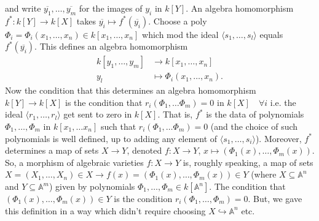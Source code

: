 \documentclass{article}
\newcommand{\A}{\mathbb{A}}
\begin{document}
and write $\overline{y_1}, \dotsc, \overline{y_m}$ for the images of $y_i$ in $k[Y]$.
An algebra homomorphism $f^*: k[Y] \to k[X]$ takes $\overline{y_i} \mapsto f^*(\overline{y_i})$.
Choose a poly $\Phi_i = \Phi_i(x_1, \dotsc, x_n) \in k[x_1, \dotsc, x_n]$ which mod the ideal $\langle s_1, \dotsc, s_l \rangle$ equals $f^*(\overline{y_i})$.
This defines an algebra homomorphism
\begin{align*}
    k[y_1, \dotsc, y_m] &\longrightarrow k[x_1, \dotsc, x_n] \\
    y_l &\mapsto \Phi_i(x_1, \dotsc, x_n).
\end{align*}
Now the condition that this determines an algebra homomorphism $k[Y] \to k[X]$ is the condition that $r_i(\Phi_1, \dotsc \Phi_m) = 0$ in $k[X] \quad \forall i$ i.e. the ideal $\langle r_1, \dotsc, r_l\rangle$ get sent to zero in $k[X]$.
That is, $f^*$ is the data of polynomials $\Phi_1, \dotsc, \Phi_m$ in $k[x_1, \dotsc x_n]$ such that $r_i(\Phi_1, \dotsc \Phi_m) = 0$ (and the choice of such polynomials is well defined, up to adding any element of $\langle s_1, \dotsc, s_i\rangle$).
Moreover, $f^*$ determines a map of sets $X \to Y$, denoted $f:X \to Y$, $x \mapsto (\Phi_1(x), \dotsc, \Phi_m(x))$.
So, a morphism of algebraic varieties $f: X \to Y$ is, roughly speaking, a map of sets $X = (X_1, \dotsc, X_n) \in X \longrightarrow f(x) = (\Phi_1(x), \dotsc, \Phi_m(x)) \in Y$ (where $X \subseteq \A^n$ and $Y \subseteq \A^m$) given by polynomials $\Phi_1, \dotsc, \Phi_m \in k[\A^n]$. The condition that $(\Phi_1(x), \dotsc, \Phi_m(x)) \in Y$ is the condition $r_i(\Phi_1, \dotsc, \Phi_m) = 0$.
But, we gave this definition in a way which didn't require choosing $X \hookrightarrow \A^n$ etc.
\end{document}
